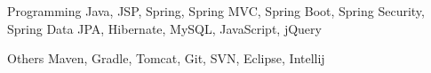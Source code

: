 
\begin{cvskills}

  \cvskill
  {Programming} %
  {Java, JSP, Spring, Spring MVC, Spring Boot, Spring Security, Spring Data JPA, Hibernate, MySQL, JavaScript, jQuery} %

  \cvskill
    {Others} %
    {Maven, Gradle, Tomcat, Git, SVN, Eclipse, Intellij} %

\end{cvskills}
